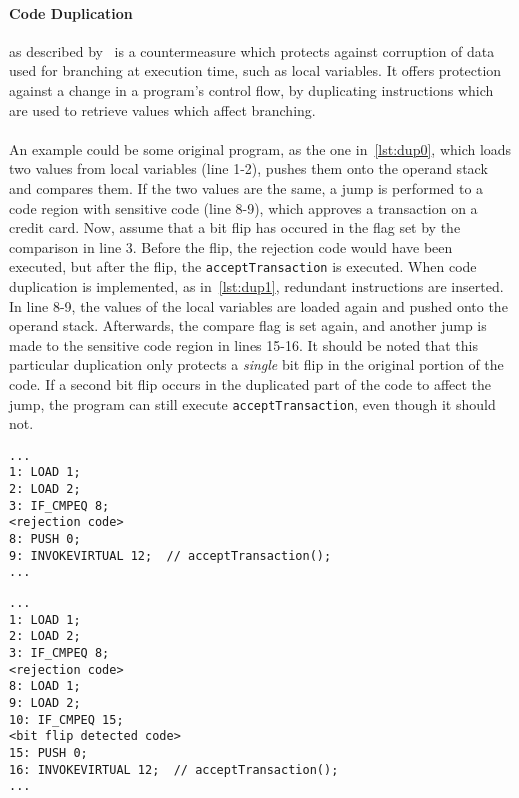 \paragraph{Code Duplication}as described by~\cite[p. 12]{javasec} is a countermeasure which protects against corruption of data used for branching at execution time, such as local variables. It offers protection against a change in a program's control flow, by duplicating instructions which are used to retrieve values which affect branching.\\\\
An example could be some original program, as the one in~\cref{lst:dup0}, which loads two values from local variables (line 1-2), pushes them onto the operand stack and compares them. If the two values are the same, a jump is performed to a code region with sensitive code (line 8-9), which approves a transaction on a credit card. Now, assume that a bit flip has occured in the flag set by the comparison in line 3. Before the flip, the rejection code would have been executed, but after the flip, the \texttt{acceptTransaction} is executed. When code duplication is implemented, as in~\cref{lst:dup1}, redundant instructions are inserted. In line 8-9, the values of the local variables are loaded again and pushed onto the operand stack. Afterwards, the compare flag is set again, and another jump is made to the sensitive code region in lines 15-16. It should be noted that this particular duplication only protects a \textit{single} bit flip in the original portion of the code. If a second bit flip occurs in the duplicated part of the code to affect the jump, the program can still execute \texttt{acceptTransaction}, even though it should not.

\begin{minipage}{\linewidth}
\begin{lstlisting}[caption={Original program without code duplication implemented. The code is written in \jcl. Note that for simplicity, the numbers in the left side are line numbers and do not denote the program counter values.}, label={lst:dup0}]
...
1: LOAD 1;
2: LOAD 2;
3: IF_CMPEQ 8;
<rejection code>
8: PUSH 0;
9: INVOKEVIRTUAL 12;  // acceptTransaction();
...
\end{lstlisting}
\end{minipage}

\begin{minipage}{\linewidth}
\begin{lstlisting}[caption={Modified program with code duplication implemented. The code is written in \jcl. Note that for simplicity, the numbers in the left side are line numbers and do not denote the program counter values.}, label={lst:dup1}]
...
1: LOAD 1;
2: LOAD 2;
3: IF_CMPEQ 8;
<rejection code>
8: LOAD 1;
9: LOAD 2;
10: IF_CMPEQ 15;
<bit flip detected code>
15: PUSH 0;
16: INVOKEVIRTUAL 12;  // acceptTransaction();
...
\end{lstlisting}
\end{minipage}
